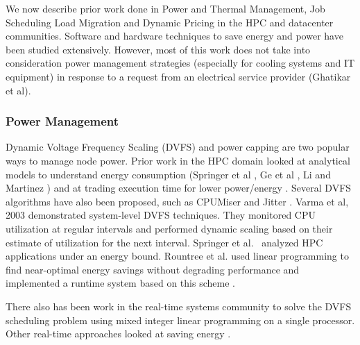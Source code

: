 We now describe prior work done in Power and Thermal Management, Job Scheduling Load 
Migration and Dynamic Pricing in the HPC and datacenter communities. Software and hardware 
techniques to save energy and power have been studied extensively. However, most of 
this work does not take into consideration power management strategies 
(especially for cooling systems and IT equipment) in response to a request from an 
electrical service provider (Ghatikar et al\cite{Ghatikar2012a}).

\subsubsection{Power Management}
Dynamic Voltage Frequency Scaling (DVFS) and power capping are two popular ways to manage 
node power. Prior work in the HPC domain looked at analytical models to understand 
energy consumption (Springer et al \cite{SpringerPPoPP2006}, Ge et al \cite{GeICPP2007},
Li and Martinez \cite{LiHPCA2006}) and at trading execution time for lower power/energy \cite{CameronSC2005,HsuSC2005}. Several DVFS algorithms have also been proposed, such as CPUMiser \cite{GeICPP2007} and Jitter \cite{KappiahSC2005}. Varma et al, 2003 \cite{varma_control-theoretic_2003} demonstrated system-level DVFS techniques. They monitored CPU utilization at regular intervals and performed dynamic scaling based on their estimate of utilization for the next interval. Springer et al.~\cite{springer:06} analyzed HPC applications under an energy bound. Rountree et al. used linear programming to find near-optimal energy savings without degrading performance \cite{rountree:07} and implemented a runtime system based on this scheme \cite{rountree:09}. 

There also has been work in the real-time systems community to solve the DVFS scheduling problem using mixed integer linear programming on a single processor\cite{IshiharaISLPED1998,SaputraLCTES2002,SwaminathanRTSS2000,SwaminathanASPDAC2001}. Other real-time approaches looked at saving energy \cite{MoncusiRTSS2003,MochockiICCAD2002,MochockiRTAS2005,ZhuTPDS2003,ZhangDAC2002}. 


